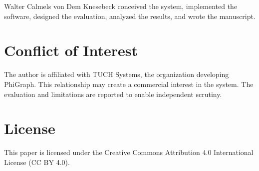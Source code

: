 \documentclass[11pt]{article}
\begin{document}
Walter Calmels von Dem Knesebeck conceived the system, implemented the
software, designed the evaluation, analyzed the results, and wrote the
manuscript.

\section*{Conflict of Interest}

The author is affiliated with TUCH Systems, the organization developing
PhiGraph. This relationship may create a commercial interest in the system.
The evaluation and limitations are reported to enable independent scrutiny.

\section*{License}

This paper is licensed under the Creative Commons Attribution 4.0
International License (CC BY 4.0).



\end{document}
